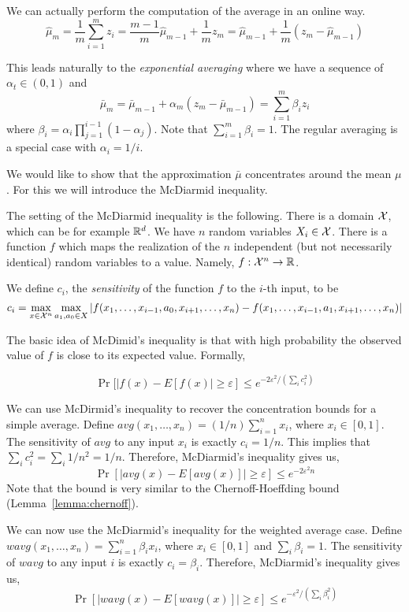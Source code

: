 We can actually perform the computation of the average in an online
way.
\[
\widehat{\mu}_m=\frac{1}{m}\sum_{i=1}^m
z_i=\frac{m-1}{m}\widehat{\mu}_{m-1}+\frac{1}{m}z_m=\widehat{\mu}_{m-1}+\frac{1}{m}(z_m-\widehat{\mu}_{m-1})
\]

This leads naturally to the {\em exponential averaging} where we have
a sequence of $\alpha_t \in(0,1)$ and
\[
\bar{\mu}_m=\bar{\mu}_{m-1}+\alpha_m(z_m-\bar{\mu}_{m-1})=\sum_{i=1}^m
\beta_i z_i
\]
where $\beta_i=\alpha_i\prod_{j=1}^{i-1}(1-\alpha_j)$. Note that
$\sum_{i=1}^m \beta_i=1$. The regular averaging is a special case
with $\alpha_i=1/i$.

We would like to show that the approximation $\bar{\mu}$
concentrates around the mean $\mu$. For this we will introduce the
McDiarmid inequality.

The setting of the McDiarmid inequality is the following. There is a
domain $\mathcal X$, which can be for example $\mathbb{R}^d$. We have $n$
random variables $X_i \in \mathcal X$. There is a function $f$ which maps
the realization of the $n$ independent (but not necessarily
identical) random variables to a value. Namely, $f:\mathcal X^n \rightarrow
\mathbb{R}$.

We define $c_i$, the \emph{sensitivity}  of the function $f$ to the $i$-th
input, to be
$$
c_i =\max_{x\in \mathcal X^n} \max_{a_1,a_0\in X} |f(x_1,
\ldots,x_{i-1},a_0,x_{i+1},\ldots, x_n)-f(x_1,
\ldots,x_{i-1},a_1,x_{i+1},\ldots, x_n)|
$$


The basic idea of McDimid's inequality is that with high probability
the observed value of $f$ is close to its expected value. Formally,
\begin{lemma}
\label{lemma:McDiarmid}
\[
\Pr[|f(x)-E[f(x)|\geq \varepsilon]\leq e^{-2\varepsilon^2/(\sum_i
c_i^2)}
\]
\end{lemma}

We can use McDirmid's inequality to recover the concentration bounds
for a simple average. Define $avg(x_1, \ldots ,
x_n)=(1/n)\sum_{i=1}^n x_i$, where $x_i\in[0,1]$. The sensitivity of
$avg$ to any input $x_i$ is exactly $c_i=1/n$. This implies that
$\sum_i c_i^2=\sum_i 1/n^2=1/n$. Therefore, McDiarmid's inequality
gives us,
\[
\Pr[|avg(x)-E[avg(x)]|\geq \varepsilon]\leq e^{-2\varepsilon^2n}
\]
Note that the bound is very similar to the Chernoff-Hoeffding bound
(Lemma~\ref{lemma:chernoff}).

We can now use the McDiarmid's inequality for the weighted average
case. Define $wavg(x_1, \ldots , x_n)=\sum_{i=1}^n \beta_i x_i$,
where $x_i\in[0,1]$ and $\sum_i \beta_i=1$. The sensitivity of
$wavg$ to any input $i$ is exactly $c_i=\beta_i$.
Therefore, McDiarmid's inequality gives us,
\[
\Pr[|wavg(x)-E[wavg(x)]|\geq \varepsilon]\leq
e^{-\varepsilon^2/(\sum_i \beta_i^2)}
\]

